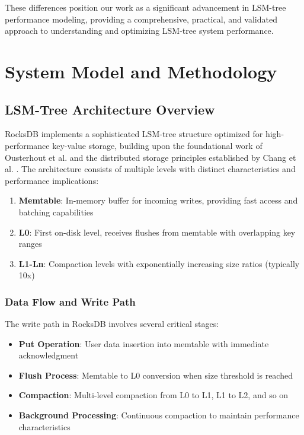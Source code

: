 \documentclass[11pt]{article}
\begin{document}
These differences position our work as a significant advancement in LSM-tree performance modeling, providing a comprehensive, practical, and validated approach to understanding and optimizing LSM-tree system performance.

\section{System Model and Methodology}
\label{sec:system_model}

\subsection{LSM-Tree Architecture Overview}

RocksDB implements a sophisticated LSM-tree structure optimized for high-performance key-value storage, building upon the foundational work of Ousterhout et al. \cite{ousterhout2013ramcloud} and the distributed storage principles established by Chang et al. \cite{chang2008bigtable}. The architecture consists of multiple levels with distinct characteristics and performance implications:

\begin{enumerate}
    \item \textbf{Memtable}: In-memory buffer for incoming writes, providing fast access and batching capabilities
    \item \textbf{L0}: First on-disk level, receives flushes from memtable with overlapping key ranges
    \item \textbf{L1-Ln}: Compaction levels with exponentially increasing size ratios (typically 10x)
\end{enumerate}

\subsubsection{Data Flow and Write Path}
The write path in RocksDB involves several critical stages:

\begin{itemize}
    \item \textbf{Put Operation}: User data insertion into memtable with immediate acknowledgment
    \item \textbf{Flush Process}: Memtable to L0 conversion when size threshold is reached
    \item \textbf{Compaction}: Multi-level compaction from L0 to L1, L1 to L2, and so on
    \item \textbf{Background Processing}: Continuous compaction to maintain performance characteristics
\end{itemize}
\end{document}
